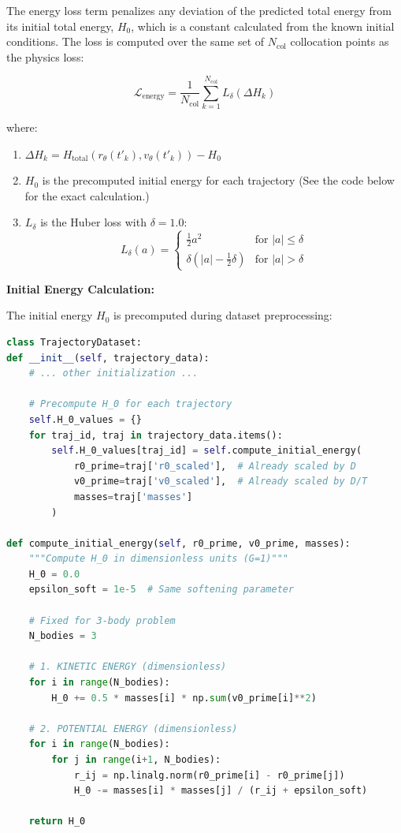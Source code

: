 The energy loss term penalizes any deviation of the predicted total energy from its initial total energy, $H_0$, which is a constant calculated from the known initial conditions. The loss is computed over the same set of $N_{\text{col}}$ collocation points as the physics loss:

\[
\mathcal{L}_{\text{energy}} = \frac{1}{N_{\text{col}}} \sum_{k=1}^{N_{\text{col}}} L_\delta(\Delta H_k)
\]

where:

\begin{enumerate}
    \item $\Delta H_k = H_{\text{total}}(r_\theta(t'_k), v_\theta(t'_k)) - H_0$

    \item $H_0$ is the precomputed initial energy for each trajectory (See the code below for the exact calculation.)

    \item $L_\delta$ is the Huber loss with $\delta = 1.0$:
    \[
    L_\delta(a) =
    \begin{cases}
        \frac{1}{2} a^2 & \text{for } |a| \leq \delta \\
        \delta (|a| - \frac{1}{2} \delta) & \text{for } |a| > \delta
    \end{cases}
    \]
\end{enumerate}

\textbf{Initial Energy Calculation:}

The initial energy $H_0$ is precomputed during dataset preprocessing:

\begin{lstlisting}[language=Python, caption={Initial Energy Calculation in Dataset Preprocessing}]
class TrajectoryDataset:
def __init__(self, trajectory_data):
    # ... other initialization ...

    # Precompute H_0 for each trajectory
    self.H_0_values = {}
    for traj_id, traj in trajectory_data.items():
        self.H_0_values[traj_id] = self.compute_initial_energy(
            r0_prime=traj['r0_scaled'],  # Already scaled by D
            v0_prime=traj['v0_scaled'],  # Already scaled by D/T
            masses=traj['masses']
        )

def compute_initial_energy(self, r0_prime, v0_prime, masses):
    """Compute H_0 in dimensionless units (G=1)"""
    H_0 = 0.0
    epsilon_soft = 1e-5  # Same softening parameter

    # Fixed for 3-body problem
    N_bodies = 3

    # 1. KINETIC ENERGY (dimensionless)
    for i in range(N_bodies):
        H_0 += 0.5 * masses[i] * np.sum(v0_prime[i]**2)

    # 2. POTENTIAL ENERGY (dimensionless)
    for i in range(N_bodies):
        for j in range(i+1, N_bodies):
            r_ij = np.linalg.norm(r0_prime[i] - r0_prime[j])
            H_0 -= masses[i] * masses[j] / (r_ij + epsilon_soft)

    return H_0
\end{lstlisting}

